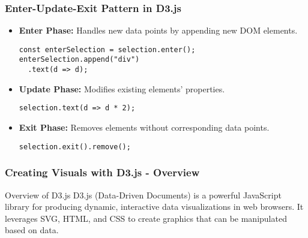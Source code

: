 \documentclass{beamer}
\begin{document}
\begin{frame}[fragile]
    \frametitle{Enter-Update-Exit Pattern in D3.js}
    \begin{itemize}
        \item \textbf{Enter Phase:} Handles new data points by appending new DOM elements.
        \begin{lstlisting}
const enterSelection = selection.enter();
enterSelection.append("div")
  .text(d => d);
        \end{lstlisting}

        \item \textbf{Update Phase:} Modifies existing elements' properties.
        \begin{lstlisting}
selection.text(d => d * 2);
        \end{lstlisting}

        \item \textbf{Exit Phase:} Removes elements without corresponding data points.
        \begin{lstlisting}
selection.exit().remove();
        \end{lstlisting}
    \end{itemize}
\end{frame}

\begin{frame}[fragile]
    \frametitle{Creating Visuals with D3.js - Overview}
    \begin{block}{Overview of D3.js}
        D3.js (Data-Driven Documents) is a powerful JavaScript library for producing dynamic, interactive data visualizations in web browsers. It leverages SVG, HTML, and CSS to create graphics that can be manipulated based on data.
    \end{block}
\end{frame}
\end{document}
